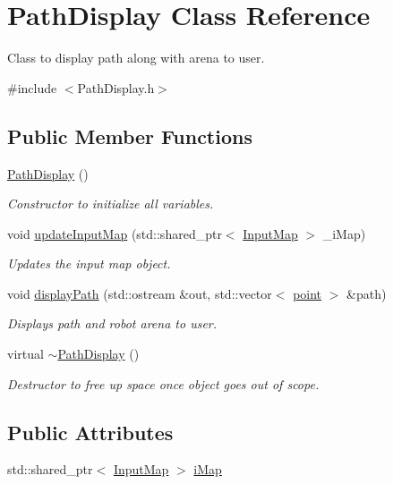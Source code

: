 \hypertarget{classPathDisplay}{}\section{Path\+Display Class Reference}
\label{classPathDisplay}


Class to display path along with arena to user.  




{\ttfamily \#include $<$Path\+Display.\+h$>$}

\subsection*{Public Member Functions}
\begin{DoxyCompactItemize}
\item 
\hyperlink{classPathDisplay_a53f5ac55c989347750fc401ced3355ed}{Path\+Display} ()
\begin{DoxyCompactList}\small\item\em Constructor to initialize all variables. \end{DoxyCompactList}\item 
void \hyperlink{classPathDisplay_ac1c4ea52e9ba7f73bd9a1569e8399575}{update\+Input\+Map} (std\+::shared\+\_\+ptr$<$ \hyperlink{classInputMap}{Input\+Map} $>$ \+\_\+i\+Map)
\begin{DoxyCompactList}\small\item\em Updates the input map object. \end{DoxyCompactList}\item 
void \hyperlink{classPathDisplay_a3dddc0af19261aaf8021551510009422}{display\+Path} (std\+::ostream \&out, std\+::vector$<$ \hyperlink{structpoint}{point} $>$ \&path)
\begin{DoxyCompactList}\small\item\em Displays path and robot arena to user. \end{DoxyCompactList}\item 
virtual \hyperlink{classPathDisplay_aa49d540a7706c1dff83e2fc9120d8d59}{$\sim$\+Path\+Display} ()
\begin{DoxyCompactList}\small\item\em Destructor to free up space once object goes out of scope. \end{DoxyCompactList}\end{DoxyCompactItemize}
\subsection*{Public Attributes}
\begin{DoxyCompactItemize}
\item 
std\+::shared\+\_\+ptr$<$ \hyperlink{classInputMap}{Input\+Map} $>$ \hyperlink{classPathDisplay_af35e969a46cc0a7c5ec013efde7ae51e}{i\+Map}
\end{DoxyCompactItemize}


